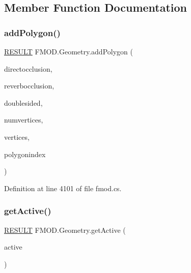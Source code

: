 \subsection{Member Function Documentation}
\mbox{\label{class_f_m_o_d_1_1_geometry_ae46964f58a37da3881e74857cfedce73}} 
\subsubsection{\texorpdfstring{add\+Polygon()}{addPolygon()}}
{\footnotesize\ttfamily \hyperlink{namespace_f_m_o_d_a305d1176ef3f8c8815861a60407ac33d}{R\+E\+S\+U\+LT} F\+M\+O\+D.\+Geometry.\+add\+Polygon (\begin{DoxyParamCaption}\item[{float}]{directocclusion,  }\item[{float}]{reverbocclusion,  }\item[{bool}]{doublesided,  }\item[{int}]{numvertices,  }\item[{\hyperlink{struct_f_m_o_d_1_1_v_e_c_t_o_r}{V\+E\+C\+T\+OR} \mbox{[}$\,$\mbox{]}}]{vertices,  }\item[{out int}]{polygonindex }\end{DoxyParamCaption})}



Definition at line 4101 of file fmod.\+cs.

\mbox{\label{class_f_m_o_d_1_1_geometry_ad588549fa909fcdcc695c7396d553f68}} 
\subsubsection{\texorpdfstring{get\+Active()}{getActive()}}
{\footnotesize\ttfamily \hyperlink{namespace_f_m_o_d_a305d1176ef3f8c8815861a60407ac33d}{R\+E\+S\+U\+LT} F\+M\+O\+D.\+Geometry.\+get\+Active (\begin{DoxyParamCaption}\item[{out bool}]{active }\end{DoxyParamCaption})}



